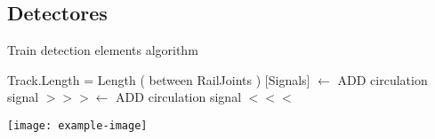 \subsection{Detectores}

\lipsum[1-2]

\begin{algorithm}[hbt!]
            \caption{Train detection elements algorithm}\label{alg:RJ}
            \DontPrintSemicolon
            \SetNoFillComment
            \LinesNotNumbered 
            {
                Track.Length = Length ( between RailJoints )\;
                {
                    [Signals] $\gets$ ADD circulation signal $>>>$\;
                    [Signals] $\gets$ ADD circulation signal $<<<$\;
                }
            }
            \KwResult{[Signals]} 
        \end{algorithm} 

\lipsum[1]
\texttt{[image: example-image]}\\
\lipsum[1]